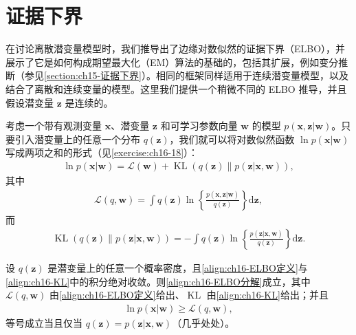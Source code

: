 \documentclass[../../main.tex]{subfiles}
\begin{document}
\section{证据下界}\label{section:ch16-证据下界}

在讨论离散潜变量模型时，我们推导出了边缘对数似然的证据下界（ELBO），并展示了它是如何构成期望最大化（EM）算法的基础的，包括其扩展，例如变分推断（参见\cref{section:ch15-证据下界}）。相同的框架同样适用于连续潜变量模型，以及结合了离散和连续变量的模型。这里我们提供一个稍微不同的 ELBO 推导，并且假设潜变量 $\bm{z}$ 是连续的。

考虑一个带有观测变量 $\bm{x}$、潜变量 $\bm{z}$ 和可学习参数向量 $\bm{w}$ 的模型 $p(\bm{x},\bm{z}|\bm{w})$。只要引入潜变量上的任意一个分布 $q(\bm{z})$，我们就可以将对数似然函数 $\ln p(\bm{x}|\bm{w})$ 写成两项之和的形式（见\cref{exercise:ch16-18}）：
\begin{align}
  \ln p(\bm{x}|\bm{w})=\mathcal{L}(\bm{w})+\operatorname{KL}\left(q(\bm{z})\|p(\bm{z}|\bm{x},\bm{w})\right),
  \label{align:ch16-ELBO分解}
\end{align}
其中
\begin{align}
  \mathcal{L}(q,\bm{w})=\int q(\bm{z})\ln\!\left\{\frac{p(\bm{x},\bm{z}|\bm{w})}{q(\bm{z})}\right\}\mathrm{d}\bm{z},
  \label{align:ch16-ELBO定义}
\end{align}
而
\begin{align}
  \operatorname{KL}\left(q(\bm{z})\|p(\bm{z}|\bm{x},\bm{w})\right)=-\int q(\bm{z})\ln\!\left\{\frac{p(\bm{z}|\bm{x},\bm{w})}{q(\bm{z})}\right\}\mathrm{d}\bm{z}.
  \label{align:ch16-KL}
\end{align}

\begin{proposition}[证据下界分解]\label{proposition:ch16-ELBO分解}
设 $q(\bm{z})$ 是潜变量上的任意一个概率密度，且\eqref{align:ch16-ELBO定义}与\eqref{align:ch16-KL}中的积分绝对收敛。则\eqref{align:ch16-ELBO分解}成立，其中 $\mathcal{L}(q,\bm{w})$ 由\eqref{align:ch16-ELBO定义}给出、$\operatorname{KL}$ 由\eqref{align:ch16-KL}给出；并且
\begin{align}
  \ln p(\bm{x}|\bm{w})\geqslant\mathcal{L}(q,\bm{w}),
  \label{align:ch16-ELBO不等式}
\end{align}
等号成立当且仅当 $q(\bm{z})=p(\bm{z}|\bm{x},\bm{w})$（几乎处处）。
\end{proposition}
\end{document}
